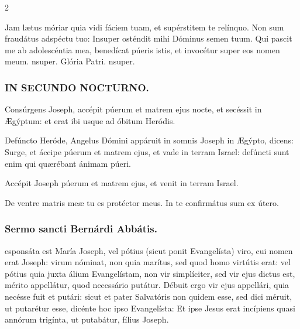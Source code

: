 \documentclass[9pt,twoside]{extarticle}
\begin{document}
\begin{multicols}{2}
\begin{tightlist}{}
\item {} Jam lætus móriar quia vidi fáciem tuam, et supérstitem te relínquo. Non sum fraudátus adspéctu tuo: \textred{*} Insuper osténdit mihi Dóminus semen tuum.  Qui pascit me ab adolescéntia mea, benedícat púeris istis, et invocétur super eos nomen meum. nsuper. Glória Patri. nsuper.
\end{tightlist}

\subsubsection*{\center \textsc{IN SECUNDO NOCTURNO.}}
\begin{tightlist}{}
\item {} Consúrgens Joseph, accépit púerum et matrem ejus nocte, et secéssit in Ægýptum: et erat ibi usque ad óbitum Heródis.
\item {} Defúncto Heróde, Angelus Dómini appáruit in somnis Joseph in Ægýpto, dicens: Surge, et áccipe púerum et matrem ejus, et vade in terram Israel: defúncti sunt enim qui quærébant ánimam púeri.
\item {} Accépit Joseph púerum et matrem ejus, et venit in terram Israel.
\item {} De ventre matris meæ tu es protéctor meus.  In te confirmátus sum ex útero.
\end{tightlist}

\subsubsection*{\center Sermo sancti Bernárdi Abbátis.}
\begin{center}\end{center}
esponsáta est María Joseph, vel pótius (sicut ponit Evangelísta) viro, cui nomen erat Joseph: virum nóminat, non quia marítus, sed quod homo virtútis erat: vel pótius quia juxta álium Evangelístam, non vir simplíciter, sed vir ejus dictus est, mérito appellátur, quod necessário putátur. Débuit ergo vir ejus appellári, quia necésse fuit et putári: sicut et pater Salvatóris non quidem esse, sed dici méruit, ut putarétur esse, dicénte hoc ipso Evangelísta: Et ipse Jesus erat incípiens quasi annórum trigínta, ut putabátur, fílius Joseph.


\end{multicols}
\end{document}

